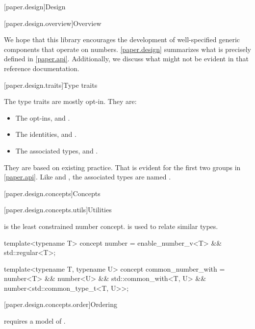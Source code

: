 

[paper.design]{Design}

[paper.design.overview]{Overview}

\pnum
We hope that this library encourages the development of well-specified generic components that operate on numbers.
\ref{paper.design} summarizes what is precisely defined in \ref{paper.api}.
Additionally, we discuss what might not be evident in that reference documentation.

[paper.design.traits]{Type traits}

\pnum
The type traits are mostly opt-in.
They are:
\begin{itemize}
\item The  opt-ins,  and .
\item The identities,  and .
\item The associated types,  and .
\end{itemize}

\pnum
They are based on existing practice.
That is evident for the first two groups in \ref{paper.api}.
Like  and ,
the associated types are named .

[paper.design.concepts]{Concepts}

[paper.design.concepts.utils]{Utilities}

\pnum
{} is the least constrained number concept.
 is used to relate similar types.
\begin{codeblock}
template<typename T>
concept number = enable_number_v<T> && std::regular<T>;

template<typename T, typename U>
concept common_number_with =
  number<T> && number<U> && std::common_with<T, U> && number<std::common_type_t<T, U>>;
\end{codeblock}

[paper.design.concepts.order]{Ordering}

\pnum
{} requires a model of .


